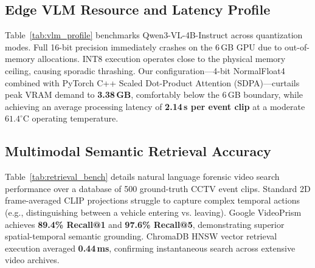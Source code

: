 \documentclass[10pt, conference]{IEEEtran}
\begin{document}
\subsection{Edge VLM Resource and Latency Profile}
Table~\ref{tab:vlm_profile} benchmarks Qwen3-VL-4B-Instruct across quantization modes. Full 16-bit precision immediately crashes on the 6\,GB GPU due to out-of-memory allocations. INT8 execution operates close to the physical memory ceiling, causing sporadic thrashing. Our configuration—4-bit NormalFloat4 combined with PyTorch C++ Scaled Dot-Product Attention (SDPA)—curtails peak VRAM demand to \textbf{3.38\,GB}, comfortably below the 6\,GB boundary, while achieving an average processing latency of \textbf{2.14\,s per event clip} at a moderate $61.4^\circ\text{C}$ operating temperature.

\begin{table}[!t]
\centering
\caption{Multimodal Natural Language Video Retrieval Performance (Google VideoPrism vs. Baseline Embeddings on ChromaDB)}
\label{tab:retrieval_bench}
\end{table}

\subsection{Multimodal Semantic Retrieval Accuracy}
Table~\ref{tab:retrieval_bench} details natural language forensic video search performance over a database of 500 ground-truth CCTV event clips. Standard 2D frame-averaged CLIP projections struggle to capture complex temporal actions (e.g., distinguishing between a vehicle entering vs. leaving). Google VideoPrism achieves \textbf{89.4\% Recall@1} and \textbf{97.6\% Recall@5}, demonstrating superior spatial-temporal semantic grounding. ChromaDB HNSW vector retrieval execution averaged \textbf{0.44\,ms}, confirming instantaneous search across extensive video archives.
\end{document}
